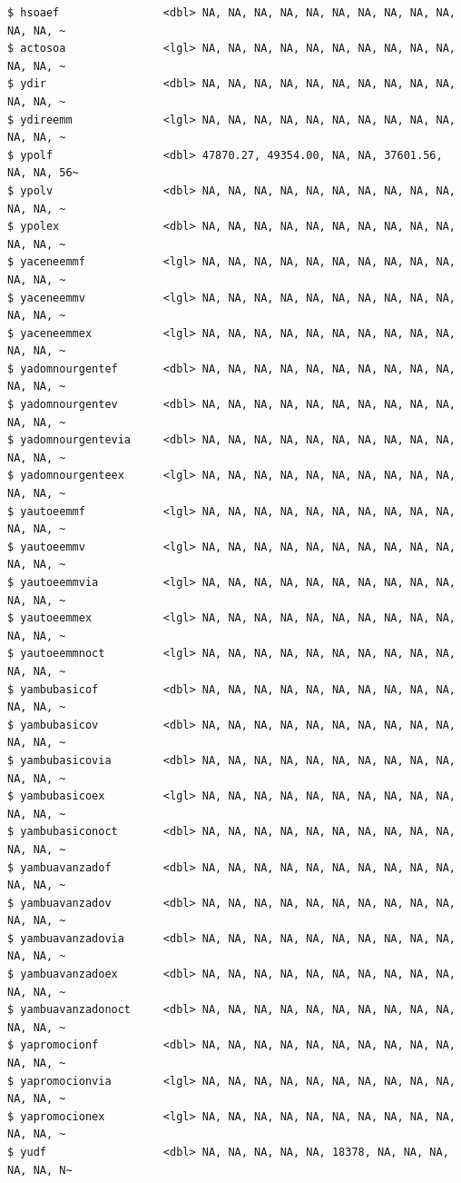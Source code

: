 \documentclass[
  letterpaper,
  DIV=11,
  numbers=noendperiod]{scrreprt}
\begin{document}
\begin{verbatim}
$ hsoaef                <dbl> NA, NA, NA, NA, NA, NA, NA, NA, NA, NA, NA, NA, ~
$ actosoa               <lgl> NA, NA, NA, NA, NA, NA, NA, NA, NA, NA, NA, NA, ~
$ ydir                  <dbl> NA, NA, NA, NA, NA, NA, NA, NA, NA, NA, NA, NA, ~
$ ydireemm              <lgl> NA, NA, NA, NA, NA, NA, NA, NA, NA, NA, NA, NA, ~
$ ypolf                 <dbl> 47870.27, 49354.00, NA, NA, 37601.56, NA, NA, 56~
$ ypolv                 <dbl> NA, NA, NA, NA, NA, NA, NA, NA, NA, NA, NA, NA, ~
$ ypolex                <dbl> NA, NA, NA, NA, NA, NA, NA, NA, NA, NA, NA, NA, ~
$ yaceneemmf            <lgl> NA, NA, NA, NA, NA, NA, NA, NA, NA, NA, NA, NA, ~
$ yaceneemmv            <lgl> NA, NA, NA, NA, NA, NA, NA, NA, NA, NA, NA, NA, ~
$ yaceneemmex           <lgl> NA, NA, NA, NA, NA, NA, NA, NA, NA, NA, NA, NA, ~
$ yadomnourgentef       <dbl> NA, NA, NA, NA, NA, NA, NA, NA, NA, NA, NA, NA, ~
$ yadomnourgentev       <dbl> NA, NA, NA, NA, NA, NA, NA, NA, NA, NA, NA, NA, ~
$ yadomnourgentevia     <dbl> NA, NA, NA, NA, NA, NA, NA, NA, NA, NA, NA, NA, ~
$ yadomnourgenteex      <lgl> NA, NA, NA, NA, NA, NA, NA, NA, NA, NA, NA, NA, ~
$ yautoeemmf            <lgl> NA, NA, NA, NA, NA, NA, NA, NA, NA, NA, NA, NA, ~
$ yautoeemmv            <lgl> NA, NA, NA, NA, NA, NA, NA, NA, NA, NA, NA, NA, ~
$ yautoeemmvia          <lgl> NA, NA, NA, NA, NA, NA, NA, NA, NA, NA, NA, NA, ~
$ yautoeemmex           <lgl> NA, NA, NA, NA, NA, NA, NA, NA, NA, NA, NA, NA, ~
$ yautoeemmnoct         <lgl> NA, NA, NA, NA, NA, NA, NA, NA, NA, NA, NA, NA, ~
$ yambubasicof          <dbl> NA, NA, NA, NA, NA, NA, NA, NA, NA, NA, NA, NA, ~
$ yambubasicov          <dbl> NA, NA, NA, NA, NA, NA, NA, NA, NA, NA, NA, NA, ~
$ yambubasicovia        <dbl> NA, NA, NA, NA, NA, NA, NA, NA, NA, NA, NA, NA, ~
$ yambubasicoex         <lgl> NA, NA, NA, NA, NA, NA, NA, NA, NA, NA, NA, NA, ~
$ yambubasiconoct       <dbl> NA, NA, NA, NA, NA, NA, NA, NA, NA, NA, NA, NA, ~
$ yambuavanzadof        <dbl> NA, NA, NA, NA, NA, NA, NA, NA, NA, NA, NA, NA, ~
$ yambuavanzadov        <dbl> NA, NA, NA, NA, NA, NA, NA, NA, NA, NA, NA, NA, ~
$ yambuavanzadovia      <dbl> NA, NA, NA, NA, NA, NA, NA, NA, NA, NA, NA, NA, ~
$ yambuavanzadoex       <dbl> NA, NA, NA, NA, NA, NA, NA, NA, NA, NA, NA, NA, ~
$ yambuavanzadonoct     <dbl> NA, NA, NA, NA, NA, NA, NA, NA, NA, NA, NA, NA, ~
$ yapromocionf          <dbl> NA, NA, NA, NA, NA, NA, NA, NA, NA, NA, NA, NA, ~
$ yapromocionvia        <lgl> NA, NA, NA, NA, NA, NA, NA, NA, NA, NA, NA, NA, ~
$ yapromocionex         <lgl> NA, NA, NA, NA, NA, NA, NA, NA, NA, NA, NA, NA, ~
$ yudf                  <dbl> NA, NA, NA, NA, NA, 18378, NA, NA, NA, NA, NA, N~

\end{verbatim}
\end{document}
